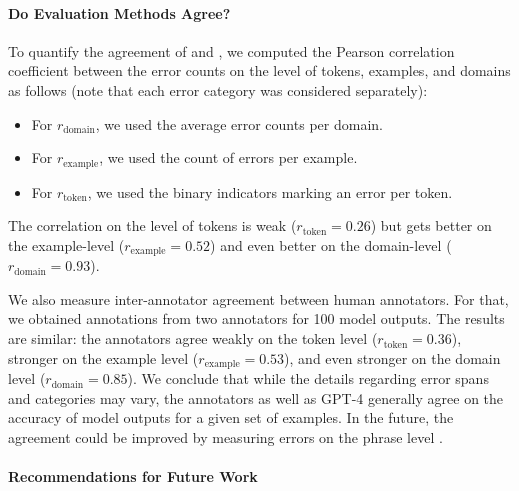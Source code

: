 \paragraph{Do Evaluation Methods Agree?}
\label{sec:quintd:metricscorr}
To quantify the agreement of \humanmetric{} and \gptmetric{}, we computed the Pearson correlation coefficient between the error counts on the level of tokens, examples, and domains as follows (note that each error category was considered separately):
\begin{itemize}
    \item For $r_{\text{domain}}$, we used the average error counts per domain.
    \item For $r_{\text{example}}$, we used the count of errors per example.
    \item For $r_{\text{token}}$, we used the binary indicators marking an error per token.
\end{itemize}
The correlation on the level of tokens is weak ($r_{\text{token}}=0.26$) but gets better on the example-level ($r_{\text{example}}=0.52$) and even better on the domain-level ($r_{\text{domain}}=0.93$).

We also measure inter-annotator agreement between human annotators. For that, we obtained annotations from two annotators for 100 model outputs. The results are similar: the annotators agree weakly on the token level ($r_{\text{token}}=0.36$), stronger on the example level ($r_{\text{example}}=0.53$), and even stronger on the domain level ($r_{\text{domain}}=0.85$). We conclude that while the details regarding error spans and categories may vary, the annotators as well as GPT-4 generally agree on the accuracy of model outputs for a given set of examples. In the future, the agreement could be improved by measuring errors on the phrase level \cite{vamvas2022little}.


\paragraph{Recommendations for Future Work}
\label{sec:quintd:future}

